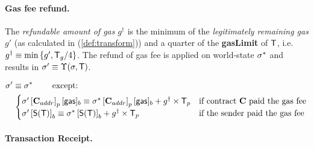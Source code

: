 \paragraph{Gas fee refund.}

The \emph{refundable amount of gas} $g^{\dagger}$ is the minimum of the \emph{legitimately remaining gas} $g'$ (as calculated in (\ref{def:transform})) and a quarter of the \textbf{gasLimit} of $\textsf{T}$,
	i.e. $g^{\dagger}\equiv \min{\left \{{g', \textsf{T}_g/4} \right \}}$.
The refund of gas fee is applied on world-state $\mathbf{\sigma}^{*}$ and results in $\mathbf{\sigma}'\equiv \Upsilon(\mathbf{\sigma},\textsf{T})$.

\begin{align}
	& \mathbf{\sigma}'  \equiv \mathbf{\sigma}^* \qquad \mbox{  except:}\\
	& \quad \begin{cases} 
		\mathbf{\sigma}'\left[\mathbf{C}_{addr}\right]_p[{\sf gas}]_b \equiv \mathbf{\sigma}^*\left[\mathbf{C}_{addr}\right]_p[{\sf gas}]_b+g^{\dagger}\times \textsf{T}_p 
		& \mbox{if contract $\mathbf{C}$ paid the gas fee}\\
		\mathbf{\sigma}' \left[\mathsf{S}{\left({\textsf{T}} \right)}\right]_b \equiv \mathbf{\sigma}^*\left[\mathsf{S}{\left({\textsf{T}} \right)}\right]_b + g^{\dagger}\times \textsf{T}_p 
		& \mbox{if the sender paid the gas fee}
	\end{cases} 
\end{align}



\paragraph{Transaction Receipt.} 

